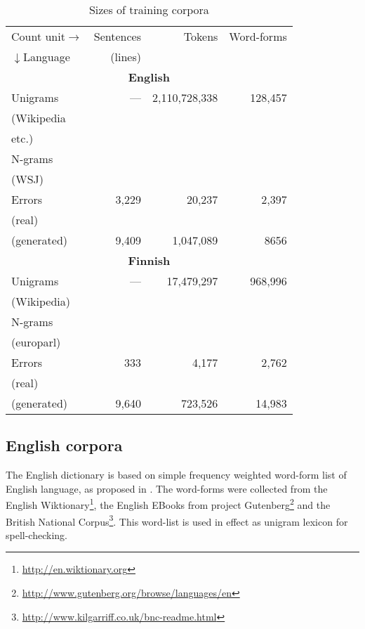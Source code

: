 \documentclass[11pt,a4paper]{article}
\begin{document}
\begin{table}[h]
  \begin{center}
    \caption{Sizes of training corpora
    \label{table:corpora}}
    \begin{scriptsize}
      \begin{tabular}{l|rrr}
        \hline
        Count unit$\rightarrow$ & Sentences & Tokens & Word-forms \\
        $\downarrow$Language    & (lines)   &        &  \\
        \hline
        \multicolumn{4}{c}{\textbf{English}} \\
        \hline
        Unigrams & --- & 2,110,728,338 & 128,457  \\
        (Wikipedia & & & \\
        etc.) & & & \\
        N-grams & & & \\
        (WSJ) & & & \\
        Errors & 3,229 & 20,237 & 2,397 \\
        (real) & & & \\
        (generated) & 9,409 & 1,047,089 & 8656 \\
        \hline
        \multicolumn{4}{c}{\textbf{Finnish}} \\
        \hline
        Unigrams & --- & 17,479,297 & 968,996 \\
        (Wikipedia) & & & \\
        N-grams & & & \\
        (europarl) & & & \\
        Errors & 333 & 4,177 & 2,762 \\
        (real) & & & \\
        (generated) & 9,640 & 723,526 & 14,983 \\
        \hline
      \end{tabular}
    \end{scriptsize}
  \end{center}
\end{table}

\subsection{English corpora}

The English dictionary is based on simple frequency weighted word-form list of
English language, as proposed in \cite{norvig/2010}. The word-forms were
collected from the English Wiktionary\footnote{\url{http://en.wiktionary.org}},
the English EBooks from project
Gutenberg\footnote{\url{http://www.gutenberg.org/browse/languages/en}} and the
British National
Corpus\footnote{\url{http://www.kilgarriff.co.uk/bnc-readme.html}}. This
word-list is used in effect as unigram lexicon for spell-checking.
\end{document}
